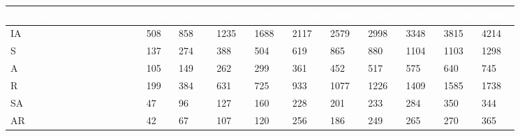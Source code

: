 \begin{table}[t]
\centering
\begin{tabular}{|l|l|l|l|l|l|l|l|l|l|l|}   
\hline  \rowcolor{black} \scriptsize \bf \textcolor {white}{ Requests Number (VMS)}
& \scriptsize \bf \textcolor {white}{5000}
& \scriptsize \bf \textcolor {white}{10000}
& \scriptsize \bf \textcolor  {white}{15000}
& \scriptsize \bf \textcolor  {white}{20000}
& \scriptsize \bf \textcolor  {white}{25000}
& \scriptsize \bf \textcolor  {white}{30000} 
& \scriptsize \bf \textcolor  {white}{35000}
& \scriptsize \bf \textcolor  {white}{40000}
& \scriptsize \bf \textcolor  {white}{45000}
& \scriptsize \bf \textcolor {white}{50000}\\ \hline
\scriptsize  {IA }
& \scriptsize  {508}
& \scriptsize {858}
& \scriptsize {1235}
& \scriptsize {1688}
& \scriptsize {2117}
& \scriptsize {2579}
& \scriptsize {2998}
& \scriptsize {3348}
& \scriptsize {3815}
& \scriptsize {4214}

\\ \hline
\scriptsize  {S }
& \scriptsize  {137}
& \scriptsize {274}
& \scriptsize {388}
& \scriptsize {504}
& \scriptsize {619}
& \scriptsize {865}
& \scriptsize {880}
& \scriptsize {1104}
& \scriptsize {1103}
& \scriptsize {1298}
\\ \hline

\scriptsize  {A}
& \scriptsize  {105}
& \scriptsize {149}
& \scriptsize {262}
& \scriptsize {299}
& \scriptsize {361}
& \scriptsize {452}
& \scriptsize {517}
& \scriptsize {575}
& \scriptsize {640}
& \scriptsize {745}
\\ \hline

		
\scriptsize  {R}
& \scriptsize  {199}
& \scriptsize {384}
& \scriptsize {631}
& \scriptsize {725}
& \scriptsize {933}
& \scriptsize {1077}
& \scriptsize {1226}
& \scriptsize {1409}
& \scriptsize {1585}
& \scriptsize {1738}
\\ \hline



\scriptsize  {SA}
& \scriptsize  {47}
& \scriptsize {96}
& \scriptsize {127}
& \scriptsize {160}
& \scriptsize {228}
& \scriptsize {201}
& \scriptsize {233}
& \scriptsize {284}
& \scriptsize {350}
& \scriptsize {344}
\\ \hline

\scriptsize  {AR}
& \scriptsize  {42}
& \scriptsize {67}
& \scriptsize {107}
& \scriptsize {120}
& \scriptsize {256}
& \scriptsize {186}
& \scriptsize {249}
& \scriptsize {265}
& \scriptsize {270}
& \scriptsize {365}
\\ \hline


\end{tabular}
\end{table}
